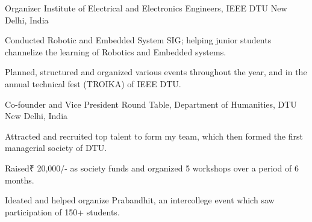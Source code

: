 


\begin{cventries}


\cventry
{Organizer} %
{Institute of Electrical and Electronics Engineers, IEEE DTU} %
{New Delhi, India} %
{} %
{ %
\begin{cvitems}
\item {Conducted Robotic and Embedded System SIG; helping junior students channelize the learning of Robotics and Embedded systems.}
\item {Planned, structured and organized various events throughout the year, and in the annual technical fest (TROIKA) of IEEE DTU.
}
\end{cvitems}
}


\cventry
{Co-founder and Vice President} %
{Round Table, Department of Humanities, DTU} %
{New Delhi, India} %
{} %
{ %
\begin{cvitems}
\item {Attracted and recruited top talent to form my team, which then formed the first managerial society of DTU.
}
\item {Raised₹ 20,000/- as society funds and organized 5 workshops over a period of 6 months.
}
\item {Ideated and helped organize Prabandhit, an intercollege event which saw participation of 150+ students.
}
\end{cvitems}
}




\end{cventries}